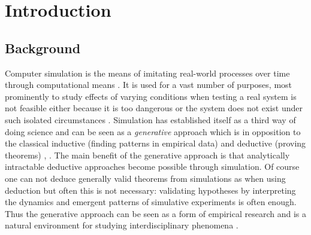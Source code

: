 \chapter{Introduction}
\label{chap:intro}

\section{Background}
Computer simulation is the means of imitating real-world processes over time through computational means \cite{banks_discrete-event_2013}. It is used for a vast number of purposes, most prominently to study effects of varying conditions when testing a real system is not feasible either because it is too dangerous or the system does not exist under such isolated circumstances \cite{sokolowski_principles_2009}. Simulation has established itself as a third way of doing science and can be seen as a \textit{generative} approach which is in opposition to the classical inductive (finding patterns in empirical data) and deductive (proving theorems) \cite{axelrod_advancing_1997}, \cite{axelrod_guide_2006}. The main benefit of the generative approach is that analytically intractable deductive approaches become possible through simulation. Of course one can not deduce generally valid theorems from simulations as when using deduction but often this is not necessary: validating hypotheses by interpreting the dynamics and emergent patterns of simulative experiments is often enough. Thus the generative approach can be seen as a form of empirical research and is a natural environment for studying interdisciplinary phenomena \cite{epstein_generative_2012}.

